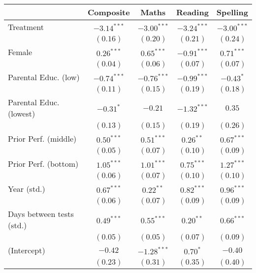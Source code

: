 
\begin{table}
\begin{center}
\begin{tabular}{l c c c c}
\hline
 & Composite & Maths & Reading & Spelling \\
\hline
Treatment                 & $-3.14^{***}$ & $-3.00^{***}$ & $-3.24^{***}$ & $-3.00^{***}$ \\
                          & $(0.16)$      & $(0.20)$      & $(0.21)$      & $(0.24)$      \\
Female                    & $0.26^{***}$  & $0.65^{***}$  & $-0.91^{***}$ & $0.71^{***}$  \\
                          & $(0.04)$      & $(0.06)$      & $(0.07)$      & $(0.07)$      \\
Parental Educ. (low)      & $-0.74^{***}$ & $-0.76^{***}$ & $-0.99^{***}$ & $-0.43^{*}$   \\
                          & $(0.11)$      & $(0.15)$      & $(0.19)$      & $(0.18)$      \\
Parental Educ. (lowest)   & $-0.31^{*}$   & $-0.21$       & $-1.32^{***}$ & $0.35$        \\
                          & $(0.13)$      & $(0.15)$      & $(0.19)$      & $(0.26)$      \\
Prior Perf. (middle)      & $0.50^{***}$  & $0.51^{***}$  & $0.26^{**}$   & $0.67^{***}$  \\
                          & $(0.05)$      & $(0.07)$      & $(0.10)$      & $(0.09)$      \\
Prior Perf. (bottom)      & $1.05^{***}$  & $1.01^{***}$  & $0.75^{***}$  & $1.27^{***}$  \\
                          & $(0.06)$      & $(0.07)$      & $(0.10)$      & $(0.10)$      \\
Year (std.)               & $0.67^{***}$  & $0.22^{**}$   & $0.82^{***}$  & $0.96^{***}$  \\
                          & $(0.06)$      & $(0.07)$      & $(0.09)$      & $(0.09)$      \\
Days between tests (std.) & $0.49^{***}$  & $0.55^{***}$  & $0.20^{**}$   & $0.66^{***}$  \\
                          & $(0.05)$      & $(0.05)$      & $(0.07)$      & $(0.09)$      \\
(Intercept)               & $-0.42$       & $-1.28^{***}$ & $0.70^{*}$    & $-0.40$       \\
                          & $(0.23)$      & $(0.31)$      & $(0.35)$      & $(0.40)$      \\

\end{tabular}
\end{center}
\end{table}
